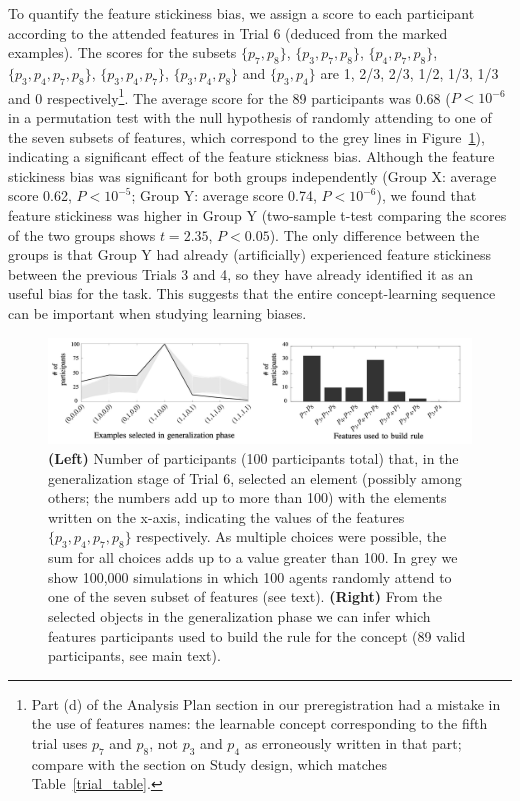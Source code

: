 To quantify the feature stickiness bias, we assign a score to each participant according to the attended features in Trial 6 (deduced from the marked examples). The scores for the subsets $\{p_7,p_8\}$, $\{p_3,p_7,p_8\}$, $\{p_4,p_7,p_8\}$, $\{p_3,p_4,p_7,p_8\}$, $\{p_3,p_4,p_7\}$, $\{p_3,p_4,p_8\}$ and $\{p_3,p_4\}$ are 1, 2/3, 2/3, 1/2, 1/3, 1/3 and 0 respectively\footnote{Part (d) of the Analysis Plan section in our preregistration had a mistake in the use of features names: the learnable concept corresponding to the fifth trial uses $p_7$ and $p_8$, not $p_3$ and $p_4$ as erroneously written in that part; compare with the section on Study design, which matches Table~\ref{trial_table}.}. The average score for the 89 participants was 0.68 ($P<10^{-6}$ in a permutation test with the null hypothesis of randomly attending to one of the seven subsets of features, which correspond to the grey lines in Figure~\ref{fig:results1}), indicating a significant effect of the feature stickness bias. Although the feature stickiness bias was significant for both groups independently (Group X: average score 0.62, $P<10^{-5}$;  Group Y: average score 0.74, $P<10^{-6}$), we found that feature stickiness was higher in Group Y (two-sample t-test comparing the scores of the two groups shows $t=2.35$,  $P<0.05$). The only difference between the groups is that Group Y had already (artificially) experienced feature stickiness between the previous Trials 3 and 4, so they have already identified it as an useful bias for the task. This suggests that the entire concept-learning sequence can be important when studying learning biases. %

\begin{figure}
\begin{center}
	\includegraphics[scale=.37]{Images/results_1.png}
\end{center}\caption{\textbf{(Left)} Number of participants (100 participants total) that, in the generalization stage of Trial 6, selected an element (possibly among others; the numbers add up to more than 100) with the elements written on the x-axis, indicating the values of the features $\{p_3,p_4,p_7,p_8\}$ respectively. As multiple choices were possible, the sum for all choices adds up to a value greater than 100. In grey we show 100,000 simulations in which 100 agents randomly attend to one of the seven subset of features (see text). \textbf{(Right)} From the selected objects in the generalization phase we can infer which features participants used to build the rule for the concept (89 valid participants, see main text).}
\label{fig:results1}
\end{figure}


